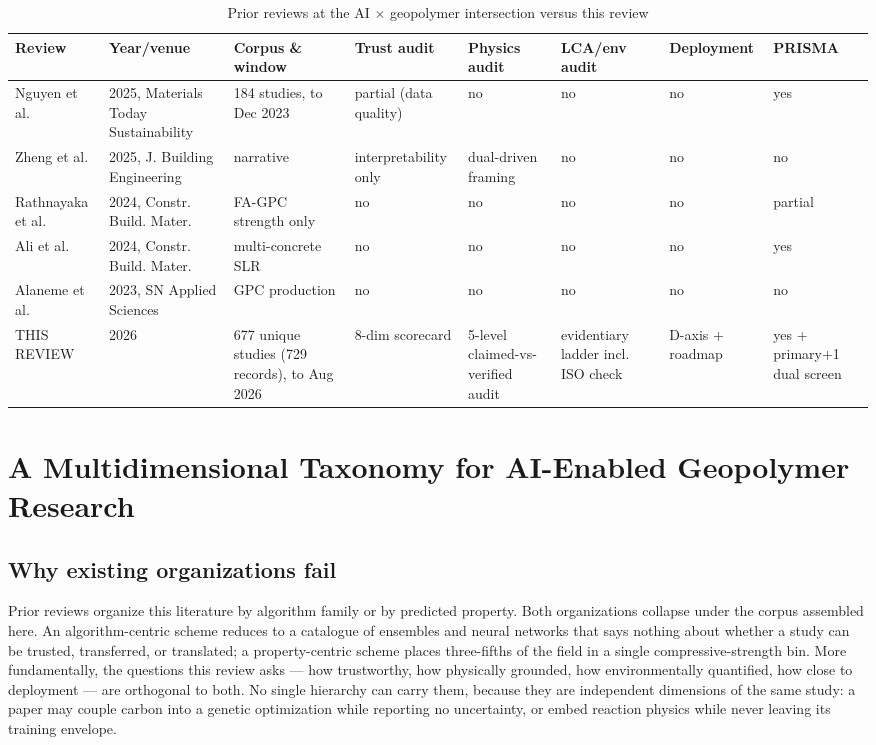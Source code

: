 \documentclass[pdflatex,sn-basic]{sn-jnl}
\begin{document}
\begin{table}[htbp]
\caption{Prior reviews at the AI $\times$ geopolymer intersection versus this review}
\centering
{\footnotesize
\begin{tabular}{p{}p{}p{}p{}p{}p{}p{}p{}}
\toprule
Review & Year/venue & Corpus \& window & Trust audit & Physics audit & LCA/env audit & Deployment & PRISMA \\
\midrule
Nguyen et al. & 2025, Materials Today Sustainability & 184 studies, to Dec 2023 & partial (data quality) & no & no & no & yes \\
Zheng et al. & 2025, J. Building Engineering & narrative & interpretability only & dual-driven framing & no & no & no \\
Rathnayaka et al. & 2024, Constr. Build. Mater. & FA-GPC strength only & no & no & no & no & partial \\
Ali et al. & 2024, Constr. Build. Mater. & multi-concrete SLR & no & no & no & no & yes \\
Alaneme et al. & 2023, SN Applied Sciences & GPC production & no & no & no & no & no \\
THIS REVIEW & 2026 & 677 unique studies (729 records), to Aug 2026 & 8-dim scorecard & 5-level claimed-vs-verified audit & evidentiary ladder incl. ISO check & D-axis + roadmap & yes + primary+1 dual screen \\
\bottomrule
\end{tabular}}
\end{table}

\section{A Multidimensional Taxonomy for AI-Enabled Geopolymer Research}

\subsection{Why existing organizations fail}

Prior reviews organize this literature by algorithm family or by predicted property. Both organizations collapse under the corpus assembled here. An algorithm-centric scheme reduces to a catalogue of ensembles and neural networks that says nothing about whether a study can be trusted, transferred, or translated; a property-centric scheme places three-fifths of the field in a single compressive-strength bin. More fundamentally, the questions this review asks --- how trustworthy, how physically grounded, how environmentally quantified, how close to deployment --- are orthogonal to both. No single hierarchy can carry them, because they are independent dimensions of the same study: a paper may couple carbon into a genetic optimization while reporting no uncertainty, or embed reaction physics while never leaving its training envelope.
\end{document}
